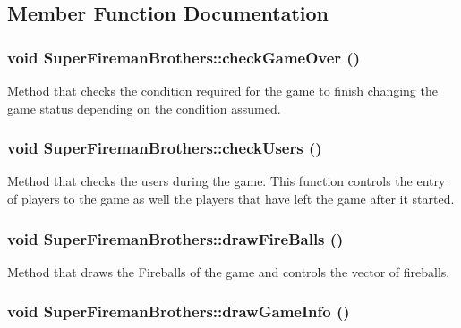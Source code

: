 \subsection{Member Function Documentation}
\hypertarget{classSuperFiremanBrothers_ab68b38d4b3287b8119d118e934d383db}{
\subsubsection[{checkGameOver}]{\setlength{\rightskip}{0pt plus 5cm}void SuperFiremanBrothers::checkGameOver ()}}
\label{classSuperFiremanBrothers_ab68b38d4b3287b8119d118e934d383db}
Method that checks the condition required for the game to finish changing the game status depending on the condition assumed. \hypertarget{classSuperFiremanBrothers_a830c241d1985fa4504b5c4362764a1d1}{
\subsubsection[{checkUsers}]{\setlength{\rightskip}{0pt plus 5cm}void SuperFiremanBrothers::checkUsers ()}}
\label{classSuperFiremanBrothers_a830c241d1985fa4504b5c4362764a1d1}
Method that checks the users during the game. This function controls the entry of players to the game as well the players that have left the game after it started. \hypertarget{classSuperFiremanBrothers_a2c47eaf4febde6a31420c7f12f855a4a}{
\subsubsection[{drawFireBalls}]{\setlength{\rightskip}{0pt plus 5cm}void SuperFiremanBrothers::drawFireBalls ()}}
\label{classSuperFiremanBrothers_a2c47eaf4febde6a31420c7f12f855a4a}
Method that draws the Fireballs of the game and controls the vector of fireballs. \hypertarget{classSuperFiremanBrothers_a6376657264e9c488f276e66f25f9ce08}{
\subsubsection[{drawGameInfo}]{\setlength{\rightskip}{0pt plus 5cm}void SuperFiremanBrothers::drawGameInfo ()}}
